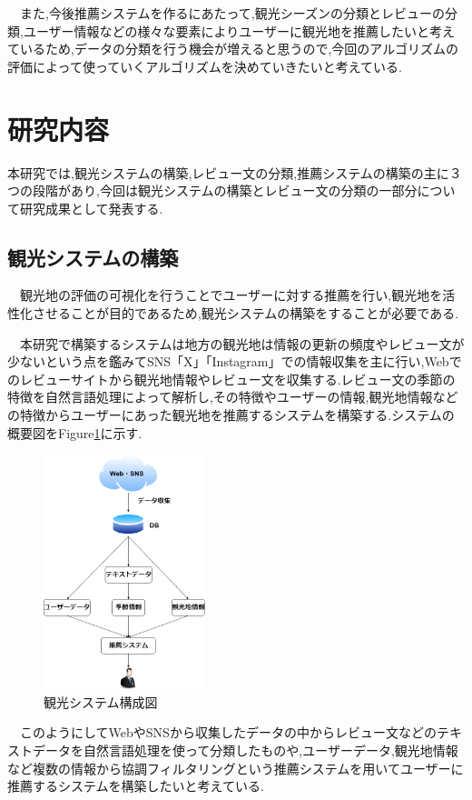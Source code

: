 \documentclass[twocolumn,dvipdfmx]{article}
\newcounter{ex}
\begin{document}
　また,今後推薦システムを作るにあたって,観光シーズンの分類とレビューの分類,ユーザー情報などの様々な要素によりユーザーに観光地を推薦したいと考えているため,データの分類を行う機会が増えると思うので,今回のアルゴリズムの評価によって使っていくアルゴリズムを決めていきたいと考えている.
  
\section{研究内容}
\label{experiments}
本研究では,観光システムの構築,レビュー文の分類,推薦システムの構築の主に３つの段階があり,今回は観光システムの構築とレビュー文の分類の一部分について研究成果として発表する.

\subsection{観光システムの構築}

　観光地の評価の可視化を行うことでユーザーに対する推薦を行い,観光地を活性化させることが目的であるため,観光システムの構築をすることが必要である.
 
　本研究で構築するシステムは地方の観光地は情報の更新の頻度やレビュー文が少ないという点を鑑みてSNS「X」「Instagram」での情報収集を主に行い,Webでのレビューサイトから観光地情報やレビュー文を収集する.レビュー文の季節の特徴を自然言語処理によって解析し,その特徴やユーザーの情報,観光地情報などの特徴からユーザーにあった観光地を推薦するシステムを構築する.システムの概要図をFigure\ref{system}に示す.

\begin{figure}[htbp]
\begin{center}
\includegraphics[width=47mm]{system2.png}
\caption{観光システム構成図}
\label{system}
\end{center}
\end{figure}

　このようにしてWebやSNSから収集したデータの中からレビュー文などのテキストデータを自然言語処理を使って分類したものや,ユーザーデータ,観光地情報など複数の情報から協調フィルタリングという推薦システムを用いてユーザーに推薦するシステムを構築したいと考えている.
\end{document}
